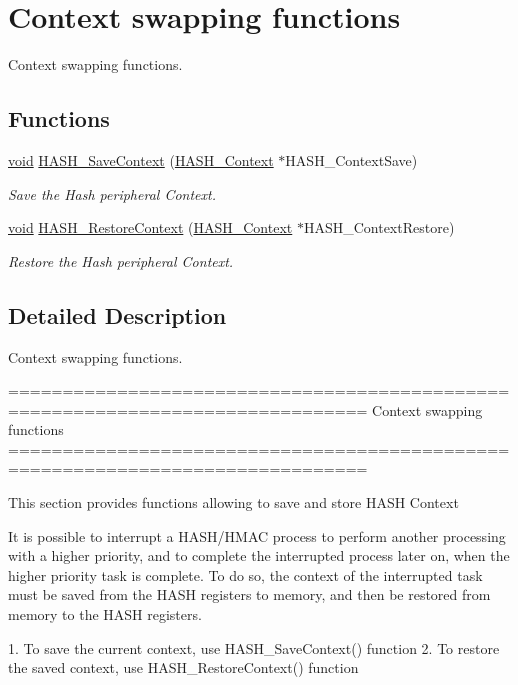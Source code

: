 \hypertarget{group___h_a_s_h___group3}{\section{Context swapping functions}
\label{group___h_a_s_h___group3}
}


Context swapping functions.  


\subsection*{Functions}
\begin{DoxyCompactItemize}
\item 
\hyperlink{group___n_a_m_e_ga18028b8badbf1ea7e704ccac3c488e82}{void} \hyperlink{group___h_a_s_h___group3_ga9432b2b66e223414c840e9313c388bc5}{H\-A\-S\-H\-\_\-\-Save\-Context} (\hyperlink{struct_h_a_s_h___context}{H\-A\-S\-H\-\_\-\-Context} $\ast$H\-A\-S\-H\-\_\-\-Context\-Save)
\begin{DoxyCompactList}\small\item\em Save the Hash peripheral Context. \end{DoxyCompactList}\item 
\hyperlink{group___n_a_m_e_ga18028b8badbf1ea7e704ccac3c488e82}{void} \hyperlink{group___h_a_s_h___group3_ga1d8412a13601376c968aec63212ca54e}{H\-A\-S\-H\-\_\-\-Restore\-Context} (\hyperlink{struct_h_a_s_h___context}{H\-A\-S\-H\-\_\-\-Context} $\ast$H\-A\-S\-H\-\_\-\-Context\-Restore)
\begin{DoxyCompactList}\small\item\em Restore the Hash peripheral Context. \end{DoxyCompactList}\end{DoxyCompactItemize}


\subsection{Detailed Description}
Context swapping functions. \begin{DoxyVerb} ===============================================================================
                             Context swapping functions
 ===============================================================================  

  This section provides functions allowing to save and store HASH Context
  
  It is possible to interrupt a HASH/HMAC process to perform another processing 
  with a higher priority, and to complete the interrupted process later on, when 
  the higher priority task is complete. To do so, the context of the interrupted 
  task must be saved from the HASH registers to memory, and then be restored 
  from memory to the HASH registers.
  
  1. To save the current context, use HASH_SaveContext() function
  2. To restore the saved context, use HASH_RestoreContext() function \end{DoxyVerb}
 

